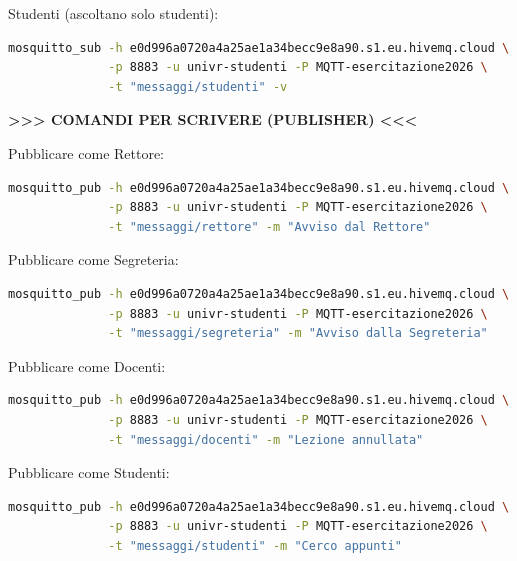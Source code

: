 \documentclass[11pt]{article}
\begin{document}
\begin{tcolorbox}[colback=green!5!white,colframe=green!75!black,title=\textbf{RISPOSTA}, breakable]
Studenti (ascoltano solo studenti):
\begin{lstlisting}[language=bash, basicstyle=\ttfamily\small]
mosquitto_sub -h e0d996a0720a4a25ae1a34becc9e8a90.s1.eu.hivemq.cloud \
              -p 8883 -u univr-studenti -P MQTT-esercitazione2026 \
              -t "messaggi/studenti" -v
\end{lstlisting}

\textbf{>>> COMANDI PER SCRIVERE (PUBLISHER) <<<}

Pubblicare come Rettore:
\begin{lstlisting}[language=bash, basicstyle=\ttfamily\small]
mosquitto_pub -h e0d996a0720a4a25ae1a34becc9e8a90.s1.eu.hivemq.cloud \
              -p 8883 -u univr-studenti -P MQTT-esercitazione2026 \
              -t "messaggi/rettore" -m "Avviso dal Rettore"
\end{lstlisting}

Pubblicare come Segreteria:
\begin{lstlisting}[language=bash, basicstyle=\ttfamily\small]
mosquitto_pub -h e0d996a0720a4a25ae1a34becc9e8a90.s1.eu.hivemq.cloud \
              -p 8883 -u univr-studenti -P MQTT-esercitazione2026 \
              -t "messaggi/segreteria" -m "Avviso dalla Segreteria"
\end{lstlisting}

Pubblicare come Docenti:
\begin{lstlisting}[language=bash, basicstyle=\ttfamily\small]
mosquitto_pub -h e0d996a0720a4a25ae1a34becc9e8a90.s1.eu.hivemq.cloud \
              -p 8883 -u univr-studenti -P MQTT-esercitazione2026 \
              -t "messaggi/docenti" -m "Lezione annullata"
\end{lstlisting}

Pubblicare come Studenti:
\begin{lstlisting}[language=bash, basicstyle=\ttfamily\small]
mosquitto_pub -h e0d996a0720a4a25ae1a34becc9e8a90.s1.eu.hivemq.cloud \
              -p 8883 -u univr-studenti -P MQTT-esercitazione2026 \
              -t "messaggi/studenti" -m "Cerco appunti"
\end{lstlisting}
\end{tcolorbox}
\end{document}
